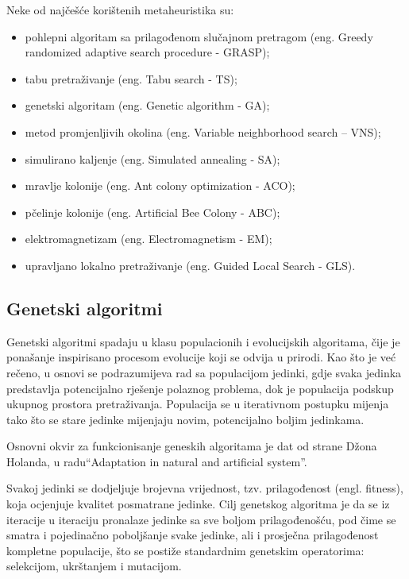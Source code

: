 \documentclass[a4paper, utf8, 11pt, colorlinks]{book}
\begin{document}
 Neke od najčešće korištenih metaheuristika su:
 \begin{itemize}
 	\item pohlepni algoritam sa prilagođenom slučajnom pretragom (eng. Greedy randomized adaptive search procedure - GRASP);
 	\item tabu pretraživanje (eng. Tabu search - TS);
 	\item genetski algoritam (eng. Genetic algorithm - GA);
 	\item metod promjenljivih okolina (eng. Variable neighborhood search – VNS);
 	\item simulirano kaljenje (eng. Simulated annealing - SA);
 	\item mravlje kolonije (eng. Ant colony optimization - ACO);
 	\item pčelinje kolonije (eng. Artificial Bee Colony - ABC);
 	\item elektromagnetizam (eng. Electromagnetism - EM);
 	\item upravljano lokalno pretraživanje (eng. Guided Local Search - GLS).
 \end{itemize}


\subsection{Genetski algoritmi}\label{intro:ga}


Genetski algoritmi spadaju u klasu populacionih i evolucijskih algoritama, čije je ponašanje inspirisano procesom evolucije koji se odvija u prirodi.
Kao što je već rečeno, u osnovi se podrazumijeva rad sa populacijom jedinki, gdje svaka jedinka predstavlja potencijalno rješenje polaznog problema, dok je populacija  podskup ukupnog prostora pretraživanja. Populacija se u iterativnom postupku mijenja tako što se stare jedinke mijenjaju novim, potencijalno boljim jedinkama.

Osnovni okvir za funkcionisanje geneskih algoritama je dat od strane Džona Holanda, u radu``Adaptation in natural and artificial system''.

Svakoj jedinki se dodjeljuje brojevna vrijednost, tzv. prilagođenost (engl.  fitness), koja ocjenjuje kvalitet posmatrane jedinke. Cilj genetskog algoritma je da se iz iteracije u iteraciju pronalaze jedinke sa sve boljom prilagođenošću, pod čime se smatra i pojedinačno poboljšanje svake jedinke, ali i prosječna prilagođenost kompletne populacije, što se postiže standardnim genetskim operatorima: selekcijom, ukrštanjem i mutacijom.
\end{document}
